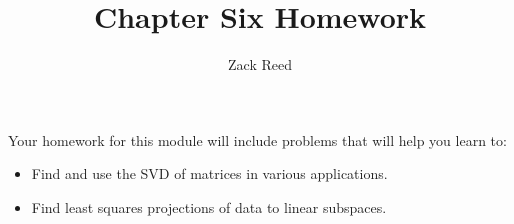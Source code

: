 \documentclass{ximera}
\author{Zack Reed}
\title{Chapter Six Homework}
\begin{document}
 
\begin{abstract}
\end{abstract}
 
\maketitle
 
Your homework for this module will include problems that will help you learn to:
 
\begin{itemize}
\item Find and use the SVD of matrices in various applications.
\item Find least squares projections of data to linear subspaces.
\end{itemize}
 
 
\end{document}
